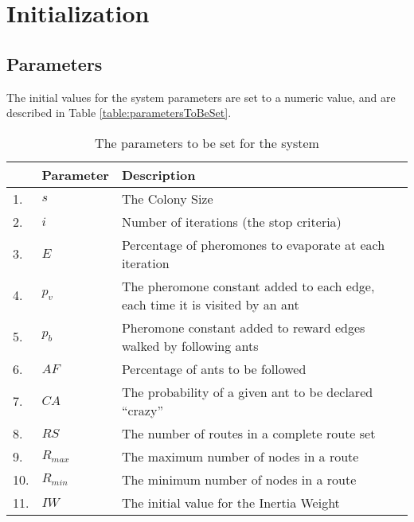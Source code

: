 \section{Initialization}
\label{sec:algoInitialization}
\subsection{Parameters}
The initial values for the system parameters are set to a numeric value, and are described in Table \vref{table:parametersToBeSet}. 

\begin{table}[H]
    \centering
	\begin{tabular}{|l|l|m{9cm}|}
    	\hline
    	~ & \textbf{Parameter} & \textbf{Description} \\
    	\hline
    	1. & $s$ & The Colony Size \\
        
    	2. & $i$ & Number of iterations (the stop criteria) \\

    	3. & $E$ & Percentage of pheromones to evaporate at each iteration \\

    	4. & $p_v$ & The pheromone constant added to each edge, each time it is visited by an ant \\
        
        5. & $p_b$ & Pheromone constant added to reward edges walked by following ants \\
   		
   		6. & $AF$ & Percentage of ants to be followed \\

   		7. & $CA$ & The probability of a given ant to be declared ``crazy'' \\
        
    	8. & $RS$ & The number of routes in a complete route set \\
        
    	9. & $R_{max}$ & The maximum number of nodes in a route \\

        10. & $R_{min}$ & The minimum number of nodes in a route \\

        11. & $IW$ & The initial value for the Inertia Weight \\
   	    \hline
    \end{tabular}
    \caption {The parameters to be set for the system}
    \label{table:parametersToBeSet}
\end{table}


